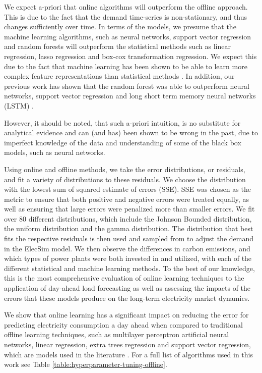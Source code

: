 \documentclass[final,3p,times,twocolumn,numbers]{elsarticle}
\begin{document}
We expect a-priori that online algorithms will outperform the offline approach. This is due to the fact that the demand time-series is non-stationary, and thus changes sufficiently over time. In terms of the models, we presume that the machine learning algorithms, such as neural networks, support vector regression and random forests will outperform the statistical methods such as linear regression, lasso regression and box-cox transformation regression. We expect this due to the fact that machine learning has been shown to be able to learn more complex feature representations than statistical methods \cite{Singh2012}. In addition, our previous work has shown that the random forest was able to outperform neural networks, support vector regression and long short term memory neural networks (LSTM) \cite{Kell2018}. 

However, it should be noted, that such a-priori intuition, is no substitute for analytical evidence and can (and has) been shown to be wrong in the past, due to imperfect knowledge of the data and understanding of some of the black box models, such as neural networks.



Using online and offline methods, we take the error distributions, or residuals, and fit a variety of distributions to these residuals. We choose the distribution with the lowest sum of squared estimate of errors (SSE). SSE was chosen as the metric to ensure that both positive and negative errors were treated equally, as well as ensuring that large errors were penalized more than smaller errors. We fit over 80 different distributions, which include the Johnson Bounded distribution, the uniform distribution and the gamma distribution. The distribution that best fits the respective residuals is then used and sampled from to adjust the demand in the ElecSim model. We then observe the differences in carbon emissions, and which types of power plants were both invested in and utilized, with each of the different statistical and machine learning methods. To the best of our knowledge, this is the most comprehensive evaluation of online learning techniques to the application of day-ahead load forecasting as well as assessing the impacts of the errors that these models produce on the long-term electricity market dynamics.





We show that online learning has a significant impact on reducing the error for predicting electricity consumption a day ahead when compared to traditional offline learning techniques, such as multilayer perceptron artificial neural networks, linear regression, extra trees regression and support vector regression, which are models used in the literature \cite{Lu1993, Ahmad2017, Chen2004}. For a full list of algorithms used in this work see Table \ref{table:hyperparameter-tuning-offline}.
\end{document}
